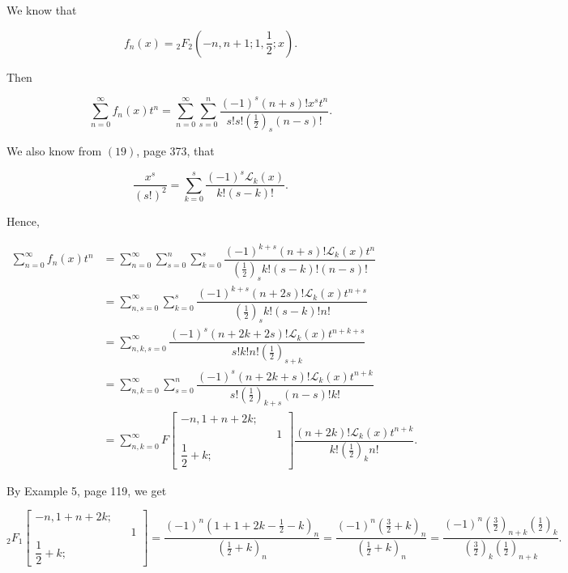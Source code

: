 \begin{solution}
We know that

$$f_n(x) = {}_2F_2 \left( -n, n+1; 1, \dfrac{1}{2}; x \right).$$

Then

$$\displaystyle\sum_{n=0}^{\infty} f_n(x) t^n = \displaystyle\sum_{n=0}^{\infty} \displaystyle\sum_{s=0}^n \dfrac{(-1)^s (n+s)! x^s t^n}{s! s! (\frac{1}{2})_s (n-s)!}.$$

We also know from $(19)$, page 373, that

$$\dfrac{x^s}{(s!)^2} = \displaystyle\sum_{k=0}^s \dfrac{(-1)^s \mathscr{L}_k(x)}{k! (s-k)!}.$$

Hence,

$$\begin{array}{ll}
\displaystyle\sum_{n=0}^{\infty} f_n(x) t^n &= \displaystyle\sum_{n=0}^{\infty} \displaystyle\sum_{s=0}^n \displaystyle\sum_{k=0}^s \dfrac{(-1)^{k+s} (n+s)! \mathscr{L}_k(x) t^n}{(\frac{1}{2})_s k! (s-k)! (n-s)!} \\
&= \displaystyle\sum_{n,s=0}^{\infty} \displaystyle\sum_{k=0}^s \dfrac{(-1)^{k+s} (n+2s)! \mathscr{L}_k(x) t^{n+s}}{(\frac{1}{2})_s k! (s-k)! n!} \\
&= \displaystyle\sum_{n,k,s=0}^{\infty} \dfrac{(-1)^s (n+2k+2s)! \mathscr{L}_k(x) t^{n+k+s}}{s! k! n! (\frac{1}{2})_{s+k}} \\
&= \displaystyle\sum_{n,k=0}^{\infty} \displaystyle\sum_{s=0}^n \dfrac{(-1)^s (n+2k+s)! \mathscr{L}_k(x) t^{n+k}}{s! (\frac{1}{2})_{k+s} (n-s)! k!} \\
&= \displaystyle\sum_{n,k=0}^{\infty} F \left[ \begin{array}{rlr}
-n, 1+n+2k; & & \\
& & 1 \\
\dfrac{1}{2} + k ; & & 
\end{array} \right] \dfrac{(n+2k)! \mathscr{L}_k(x) t^{n+k}}{k! (\frac{1}{2})_k n!}.
\end{array}$$

By Example 5, page 119, we get

$${}_2F_1 \left[ \begin{array}{rlr}
-n, 1+n+2k; & & \\
& & 1 \\
\dfrac{1}{2} + k; & & 
\end{array} \right] = \dfrac{(-1)^n (1+1+2k-\frac{1}{2}-k)_n}{(\frac{1}{2}+k)_n} = \dfrac{(-1)^n (\frac{3}{2}+k)_n}{(\frac{1}{2}+k)_n} = \dfrac{(-1)^n (\frac{3}{2})_{n+k} (\frac{1}{2})_k}{(\frac{3}{2})_k (\frac{1}{2})_{n+k}}.$$


\end{solution}

